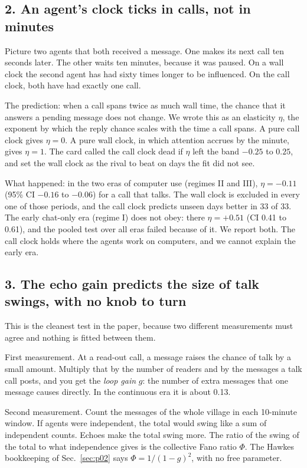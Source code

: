 \subsection*{2. An agent's clock ticks in calls, not in minutes}

Picture two agents that both received a message. One makes its next call ten seconds later. The other waits ten minutes, because it was paused. On a wall clock the second agent has had sixty times longer to be influenced. On the call clock, both have had exactly one call.

The prediction: when a call spans twice as much wall time, the chance that it answers a pending message does not change. We wrote this as an elasticity $\eta$, the exponent by which the reply chance scales with the time a call spans. A pure call clock gives $\eta=0$. A pure wall clock, in which attention accrues by the minute, gives $\eta=1$. The card called the call clock dead if $\eta$ left the band $-0.25$ to $0.25$, and set the wall clock as the rival to beat on days the fit did not see.

What happened: in the two eras of computer use (regimes II and III), $\eta=-0.11$ (95\% CI $-0.16$ to $-0.06$) for a call that talks. The wall clock is excluded in every one of those periods, and the call clock predicts unseen days better in 33 of 33. The early chat-only era (regime I) does not obey: there $\eta=+0.51$ (CI 0.41 to 0.61), and the pooled test over all eras failed because of it. We report both. The call clock holds where the agents work on computers, and we cannot explain the early era.

\subsection*{3. The echo gain predicts the size of talk swings, with no knob to turn}

This is the cleanest test in the paper, because two different measurements must agree and nothing is fitted between them.

First measurement. At a read-out call, a message raises the chance of talk by a small amount. Multiply that by the number of readers and by the messages a talk call posts, and you get the \emph{loop gain} $g$: the number of extra messages that one message causes directly. In the continuous era it is about 0.13.

Second measurement. Count the messages of the whole village in each 10-minute window. If agents were independent, the total would swing like a sum of independent counts. Echoes make the total swing more. The ratio of the swing of the total to what independence gives is the collective Fano ratio $\Phi$. The Hawkes bookkeeping of Sec.~\ref{sec:p02} says $\Phi=1/(1-g)^2$, with no free parameter.


